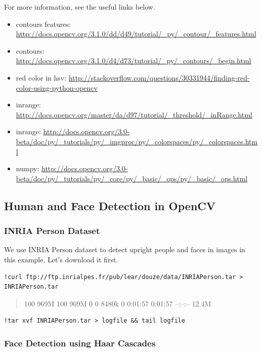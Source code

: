 For more information, see the useful links below.

\begin{itemize}
\tightlist
\item
  contours features:
  \url{http://docs.opencv.org/3.1.0/dd/d49/tutorial/_py/_contour/_features.html}
\item
  contours:
  \url{http://docs.opencv.org/3.1.0/d4/d73/tutorial/_py/_contours/_begin.html}
\item
  red color in hsv:
  \url{http://stackoverflow.com/questions/30331944/finding-red-color-using-python-opencv}
\item
  inrange:
  \url{http://docs.opencv.org/master/da/d97/tutorial/_threshold/_inRange.html}
\item
  inrange:
  \url{http://docs.opencv.org/3.0-beta/doc/py/_tutorials/py/_imgproc/py/_colorspaces/py/_colorspaces.html}
\item
  numpy:
  \url{http://docs.opencv.org/3.0-beta/doc/py/_tutorials/py/_core/py/_basic/_ops/py/_basic/_ops.html}
\end{itemize}

\subsection{Human and Face Detection in
OpenCV}\label{human-and-face-detection-in-opencv}

\subsubsection{INRIA Person Dataset}\label{inria-person-dataset-1}

We use INRIA Person dataset to detect upright people and faces in images
in this example. Let's download it first.

\begin{verbatim}
!curl ftp://ftp.inrialpes.fr/pub/lear/douze/data/INRIAPerson.tar > INRIAPerson.tar
\end{verbatim}

\begin{quote}
100 969M 100 969M 0 0 8480k 0 0:01:57 0:01:57 --:--:-- 12.4M
\end{quote}

\begin{verbatim}
!tar xvf INRIAPerson.tar > logfile && tail logfile
\end{verbatim}

\subsubsection{Face Detection using Haar
Cascades}\label{face-detection-using-haar-cascades}

